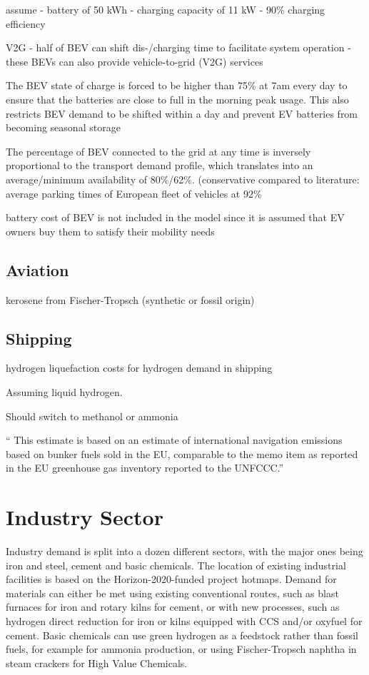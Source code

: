 assume
- battery of 50 kWh
- charging capacity of 11 kW
- 90\% charging efficiency

V2G
- half of BEV can shift dis-/charging time to facilitate system operation
- these BEVs can also provide vehicle-to-grid (V2G) services

The BEV state of charge is forced to be higher than 75\% at 7am every day
to ensure that the batteries are close to full in the morning peak usage.
This also restricts BEV demand to be shifted within a day and prevent EV
batteries from becoming seasonal storage

The percentage of BEV connected to the grid at any time is inversely proportional
to the transport demand profile, which translates into an average/minimum availability of 80\%/62\%.
(conservative compared to literature: average parking times of European fleet of vehicles at 92\%

battery cost of BEV is not included in the model since it is assumed that EV owners buy
them to satisfy their mobility needs

\subsection{Aviation}

kerosene from Fischer-Tropsch (synthetic or fossil origin)

\subsection{Shipping}

hydrogen liquefaction costs for hydrogen demand in shipping

Assuming liquid hydrogen.

Should switch to methanol or ammonia

`` This estimate is based on an estimate of international navigation emissions
based on bunker fuels sold in the EU, comparable to the memo item as reported in
the EU greenhouse gas inventory reported to the UNFCCC.''


\section{Industry Sector}


Industry demand is split into a dozen different sectors, with the major ones
being iron and steel, cement and basic chemicals. The location of existing
industrial facilities is based on the Horizon-2020-funded project hotmaps.
Demand for materials can either be met using existing conventional routes, such
as blast furnaces for iron and rotary kilns for cement, or with new processes,
such as hydrogen direct reduction for iron or kilns equipped with CCS and/or
oxyfuel for cement. Basic chemicals can use green hydrogen as a feedstock rather
than fossil fuels, for example for ammonia production, or using Fischer-Tropsch
naphtha in steam crackers for High Value Chemicals.

